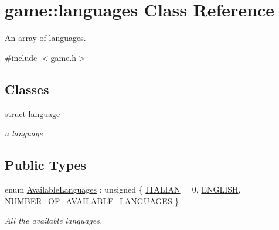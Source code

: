 \hypertarget{classgame_1_1languages}{}\section{game\+::languages Class Reference}
\label{classgame_1_1languages}


An array of languages.  




{\ttfamily \#include $<$game.\+h$>$}

\subsection*{Classes}
\begin{DoxyCompactItemize}
\item 
struct \mbox{\hyperlink{structgame_1_1languages_1_1language}{language}}
\begin{DoxyCompactList}\small\item\em a language \end{DoxyCompactList}\end{DoxyCompactItemize}
\subsection*{Public Types}
\begin{DoxyCompactItemize}
\item 
enum \mbox{\hyperlink{classgame_1_1languages_ad965ce3a9fdce02ab3caba6301f221eb}{Available\+Languages}} \+: unsigned \{ \mbox{\hyperlink{classgame_1_1languages_ad965ce3a9fdce02ab3caba6301f221eba6a9c4d893a8d2d6137b6c7cff199273b}{I\+T\+A\+L\+I\+AN}} = 0, 
\mbox{\hyperlink{classgame_1_1languages_ad965ce3a9fdce02ab3caba6301f221ebab655e8c91a47f2e3eb4e17e5d942ffe2}{E\+N\+G\+L\+I\+SH}}, 
\mbox{\hyperlink{classgame_1_1languages_ad965ce3a9fdce02ab3caba6301f221ebaf567120d543efe0ddf915638e32eeda2}{N\+U\+M\+B\+E\+R\+\_\+\+O\+F\+\_\+\+A\+V\+A\+I\+L\+A\+B\+L\+E\+\_\+\+L\+A\+N\+G\+U\+A\+G\+ES}}
 \}
\begin{DoxyCompactList}\small\item\em All the available languages. \end{DoxyCompactList}\end{DoxyCompactItemize}
